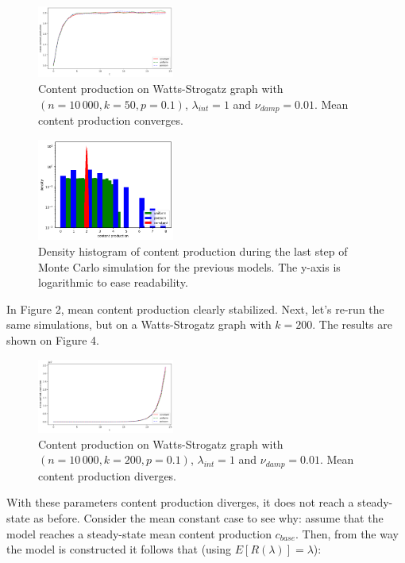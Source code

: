 \documentclass[final,5p,times,twocolumn,authoryear]{elsarticle}
\begin{document}
\begin{figure}[h]
	\centering 
	\includegraphics[width=0.4\textwidth]{figure-2.png}	
	\caption{Content production on Watts-Strogatz graph with $(n=10\,000, k=50, p=0.1)$, $\lambda_{int} = 1$ and $\nu_{damp} = 0.01$. Mean content production converges.} 
\end{figure}

\begin{figure}[h]
	\centering 
	\includegraphics[width=0.4\textwidth]{figure-3.png}	
	\caption{Density histogram of content production during the last step of Monte Carlo simulation for the previous models. The y-axis is logarithmic to ease readability.} 
\end{figure}

In Figure 2, mean content production clearly stabilized. Next, let's re-run the same simulations, but on a Watts-Strogatz graph with $k=200$. The results are shown on Figure 4.

\begin{figure}[h]
	\centering 
	\includegraphics[width=0.4\textwidth]{figure-4.png}	
	\caption{Content production on Watts-Strogatz graph with $(n=10\,000, k=200, p=0.1)$, $\lambda_{int} = 1$ and $\nu_{damp} = 0.01$. Mean content production diverges.} 
\end{figure}

With these parameters content production diverges, it does not reach a steady-state as before. Consider the mean constant case  to see why: assume that the model reaches a steady-state mean content production $c_{base}$. Then, from the way the model is constructed it follows that (using $E[R(\lambda)]=\lambda$):
\end{document}
